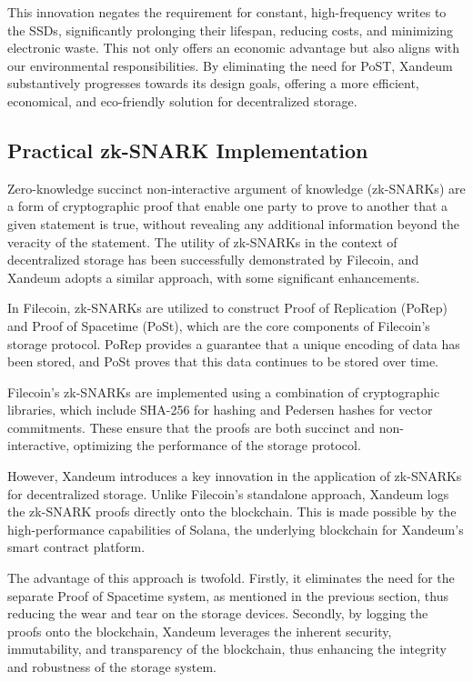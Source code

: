 \documentclass[11 pt]{article}   	%
\begin{document}
This innovation negates the requirement for constant, high-frequency writes to the SSDs, significantly prolonging their lifespan, reducing costs, and minimizing electronic waste. This not only offers an economic advantage but also aligns with our environmental responsibilities. By eliminating the need for PoST, Xandeum substantively progresses towards its design goals, offering a more efficient, economical, and eco-friendly solution for decentralized storage.

\subsection{Practical zk-SNARK Implementation}
Zero-knowledge succinct non-interactive argument of knowledge (zk-SNARKs) \cite{leastauth21} are a form of cryptographic proof that enable one party to prove to another that a given statement is true, without revealing any additional information beyond the veracity of the statement. The utility of zk-SNARKs in the context of decentralized storage has been successfully demonstrated by Filecoin, and Xandeum adopts a similar approach, with some significant enhancements.

In Filecoin, zk-SNARKs are utilized to construct Proof of Replication (PoRep) and Proof of Spacetime (PoSt), which are the core components of Filecoin's storage protocol. PoRep provides a guarantee that a unique encoding of data has been stored, and PoSt proves that this data continues to be stored over time.

Filecoin's zk-SNARKs are implemented using a combination of cryptographic libraries, which include SHA-256 for hashing and Pedersen hashes for vector commitments. These ensure that the proofs are both succinct and non-interactive, optimizing the performance of the storage protocol.

However, Xandeum introduces a key innovation in the application of zk-SNARKs for decentralized storage. Unlike Filecoin's standalone approach, Xandeum logs the zk-SNARK proofs directly onto the blockchain. This is made possible by the high-performance capabilities of Solana, the underlying blockchain for Xandeum's smart contract platform.

The advantage of this approach is twofold. Firstly, it eliminates the need for the separate Proof of Spacetime system, as mentioned in the previous section, thus reducing the wear and tear on the storage devices. Secondly, by logging the proofs onto the blockchain, Xandeum leverages the inherent security, immutability, and transparency of the blockchain, thus enhancing the integrity and robustness of the storage system.
\end{document}
